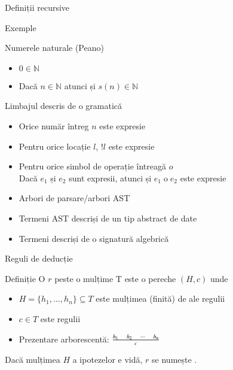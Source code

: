 \documentclass[xcolor=pdftex,romanian,colorlinks]{beamer}
\begin{document}
\begin{section}{Definiții recursive}

\begin{frame}{}{Exemple}
  \begin{block}{Numerele naturale (Peano)}
      \begin{itemize}
      \item $0 \in \mathbb{N}$
       \item Dacă $n \in \mathbb{N}$ atunci și $s(n) \in \mathbb{N}$
      \end{itemize}
  \end{block}
  \begin{block}{Limbajul descris de o gramatică \hfill 
\begin{minipage}{.35\columnwidth} \renewcommand{\syntaxKeyword}{}\syntax[\AExp]{\Int\Smid\terminal{!}\Loc \Smid \AExp\iop \AExp}{}\end{minipage}}
     \begin{itemize}
	 \item Orice număr întreg $n$ este expresie
         \item Pentru orice locație $l$, $\mathrel{!} l$ este expresie
         \item Pentru orice simbol de operație întreagă $o$\\
              Dacă $e_1$ și $e_2$ sunt expresii, atunci și $e_1 \mathrel{o} e_2$ este expresie
      \end{itemize}
  \end{block}
  \begin{itemize} 
        \item Arbori de parsare/arbori AST
        \item Termeni AST descriși de un tip abstract de date
       \item Termeni descriși de o signatură algebrică
\end{itemize}
\end{frame}

\begin{frame}{Reguli de deducție}
   \begin{block}{Definiție}
        O  $r$ peste o mulțime T este o pereche $(H,c)$ unde 
         \begin{itemize}
             \item $H = \{h_1,\ldots,h_n\}\subseteq T$ este mulțimea (finită) de  ale regulii
             \item $c\in T$ este  regulii
            \item Prezentare arborescentă: $\reg{c}{h_1\si h_2 \si \cdots \si h_n}{}$
         \end{itemize}         
        Dacă mulțimea $H$ a ipotezelor e vidă, $r$ se numește .
   \end{block}


\end{frame}
\end{section}
\end{document}
